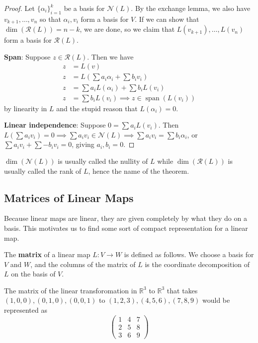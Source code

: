 \begin{proof}
Let $\lbrace \alpha_i \rbrace_{i = 1}^{k}$ be a basis for
$\mathcal{N}(L)$. By the exchange lemma, we also have $v_{k + 1}, \dots,
v_n$ so that $\alpha_i, v_i$ form a basis for $V$. If we can show that
$\dim(\mathcal{R}(L)) = n - k$, we are done, so we claim that $L(v_{k +
1}), \dots, L(v_n)$ form a basis for $\mathcal{R}(L)$.

\textbf{Span}: Suppose $z \in \mathcal{R}(L)$. Then we have
\[ \begin{aligned}
z &= L(v) \\
z &= L\left(\sum a_i \alpha_i + \sum b_i v_i\right) \\
z &= \sum a_i L(\alpha_i) + \sum b_i L(v_i) \\
z &= \sum b_i L(v_i) \implies z \in \operatorname{span}(L(v_i))
\end{aligned} \]
by linearity in $L$ and the stupid reason that $L(\alpha_i) = 0$.

\textbf{Linear independence}: Suppose $0 = \sum a_i L(v_i)$. Then
$L\left(\sum a_i v_i\right) = 0 \implies \sum a_i v_i \in \mathcal{N}(L)
\implies \sum a_i v_i = \sum b_i \alpha_i$, or $\sum a_i v_i + \sum -b_i
v_i = 0$, giving $a_i, b_i = 0$.
\end{proof}

\begin{rem}
$\dim(\mathcal{N}(L))$ is usually called the nullity of $L$ while
$\dim(\mathcal{R}(L))$ is usually called the rank of $L$, hence the name
of the theorem.
\end{rem}

\subsection{Matrices of Linear Maps}
Because linear maps are linear, they are given completely by what they
do on a basis. This motivates us to find some sort of compact
representation for a linear map.

\begin{df}
The \textbf{matrix} of a linear map $L : V \rightarrow W$ is defined as
follows. We choose a basis for $V$ and $W$, and the columns of the
matrix of $L$ is the coordinate decomposition of $L$ on the basis of
$V$.
\end{df}

\begin{ex}
The matrix of the linear transforomation in $\mathbb{R}^3$ to
$\mathbb{R}^3$ that takes $(1, 0, 0), (0, 1, 0), (0, 0, 1)$ to $(1, 2,
3),  (4, 5, 6), (7, 8, 9)$ would be represented as
\[ \begin{pmatrix}
1 & 4 & 7 \\
2 & 5 & 8 \\
3 & 6 & 9
\end{pmatrix} \]
\end{ex}

